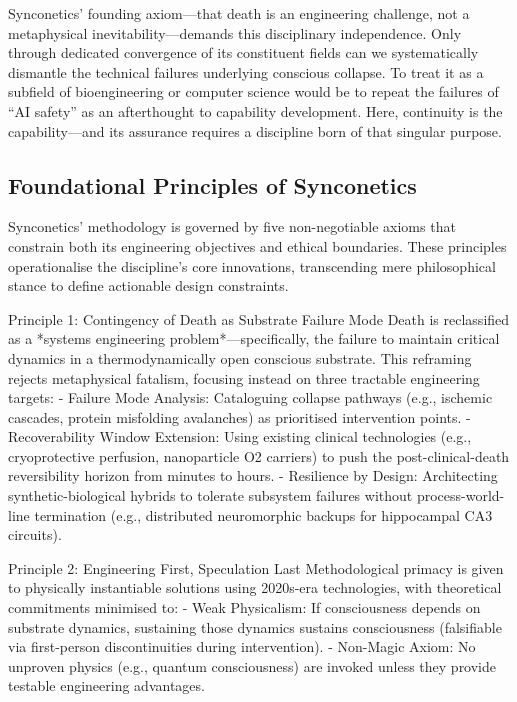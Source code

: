 \documentclass[10pt]{article}
\begin{document}
\begin{sloppypar}
  Synconetics’ founding axiom—that death is an engineering challenge, not a metaphysical inevitability—demands this disciplinary independence. Only through dedicated convergence of its constituent fields can we systematically dismantle the technical failures underlying conscious collapse. To treat it as a subfield of bioengineering or computer science would be to repeat the failures of “AI safety” as an afterthought to capability development. Here, continuity is the capability—and its assurance requires a discipline born of that singular purpose.

  \subsection{Foundational Principles of Synconetics}
  \label{sec:foundational-principles}

  Synconetics’ methodology is governed by five non-negotiable axioms that constrain both its engineering objectives and ethical boundaries. These principles operationalise the discipline’s core innovations, transcending mere philosophical stance to define actionable design constraints.

  Principle 1: Contingency of Death as Substrate Failure Mode
  Death is reclassified as a *systems engineering problem*—specifically, the failure to maintain critical dynamics in a thermodynamically open conscious substrate. This reframing rejects metaphysical fatalism, focusing instead on three tractable engineering targets:
  - Failure Mode Analysis: Cataloguing collapse pathways (e.g., ischemic cascades, protein misfolding avalanches) as prioritised intervention points.
  - Recoverability Window Extension: Using existing clinical technologies (e.g., cryoprotective perfusion, nanoparticle O2 carriers) to push the post-clinical-death reversibility horizon from minutes to hours.
  - Resilience by Design: Architecting synthetic-biological hybrids to tolerate subsystem failures without process-world-line termination (e.g., distributed neuromorphic backups for hippocampal CA3 circuits).

  Principle 2: Engineering First, Speculation Last
  Methodological primacy is given to physically instantiable solutions using 2020s-era technologies, with theoretical commitments minimised to:
  - Weak Physicalism: If consciousness depends on substrate dynamics, sustaining those dynamics sustains consciousness (falsifiable via first-person discontinuities during intervention).
  - Non-Magic Axiom: No unproven physics (e.g., quantum consciousness) are invoked unless they provide testable engineering advantages.


\end{sloppypar}
\end{document}
